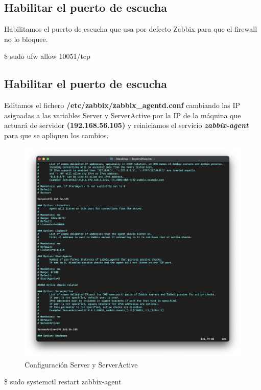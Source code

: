     \subsection{Habilitar el puerto de escucha}
    Habilitamos el puerto de escucha que usa por defecto Zabbix para que el firewall no lo bloquee.
        \begin{tcolorbox}[colback=black!10, halign=left]
            \$ sudo ufw allow 10051/tcp
        \end{tcolorbox}

    \subsection{Habilitar el puerto de escucha}
    Editamos el fichero \textbf{/etc/zabbix/zabbix\_agentd.conf} cambiando las IP asignadas a las variables Server y ServerActive por la IP de la máquina que actuará de servidor
    \textbf{(192.168.56.105)} y reiniciamos el servicio \textbf{\emph{zabbix-agent}} para que se apliquen los cambios.
        \begin{figure}[H]
            \centering
            \includegraphics[scale=0.45]{images/ubuntu_servers.png}
            \caption{Configuración Server y ServerActive}
            \label{fig:ubuntu_servers}
        \end{figure}
        \begin{tcolorbox}[colback=black!10, halign=left]
            \$ sudo systemctl restart zabbix-agent
        \end{tcolorbox}

